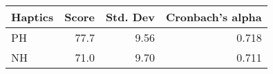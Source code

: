 \begin{tabular}{lrrr}
\toprule
Haptics &  Score &  Std. Dev &  Cronbach's alpha \\
\midrule
     PH &   77.7 &      9.56 &             0.718 \\
     NH &   71.0 &      9.70 &             0.711 \\
\bottomrule
\end{tabular}
